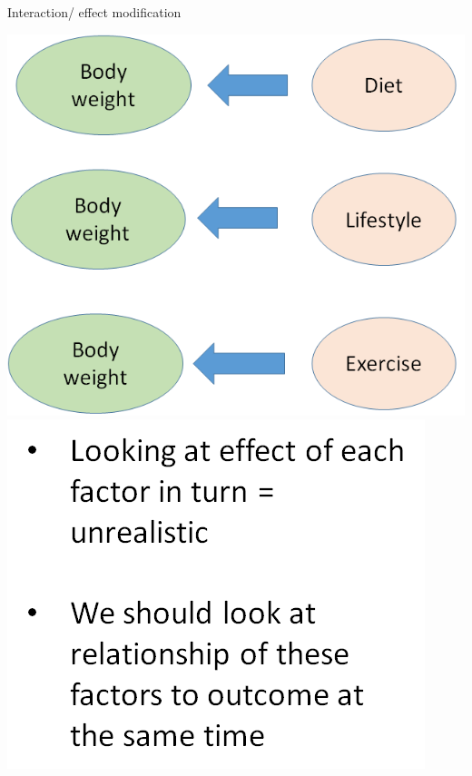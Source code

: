 \documentclass[ignorenonframetext,]{beamer}
\begin{document}
\begin{frame}{Interaction/ effect modification}

\includegraphics{lifestyle2.png}\includegraphics{lifestyle3.png}

\end{frame}
\end{document}
